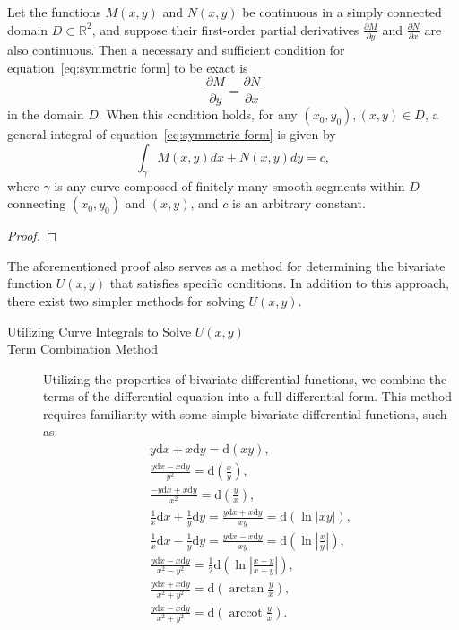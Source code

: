 \documentclass[11pt]{../../TexTemplate/elegantbook}
\begin{document}
\begin{theorem}
    Let the functions \(M(x, y)\) and \(N(x, y)\) be continuous in a simply connected domain \(D \subset \mathbb{R}^2\), 
    and suppose their first-order partial derivatives \(\frac{\partial M}{\partial y}\) and \(\frac{\partial N}{\partial x}\) are also continuous. 
    Then a necessary and sufficient condition for equation~\eqref{eq:symmetric form} to be exact is
    \[
    \frac{\partial M}{\partial y} = \frac{\partial N}{\partial x}
    \]
    in the domain \(D\). 
    When this condition holds, for any \((x_0, y_0), (x, y) \in D\), a general integral of equation~\eqref{eq:symmetric form} is given by
    \[
    \int_{\gamma} M(x, y)dx + N(x, y)dy = c,
    \]
    where \(\gamma\) is any curve composed of finitely many smooth segments within \(D\) 
    connecting \((x_0, y_0)\) and \((x, y)\), and \(c\) is an arbitrary constant.
\end{theorem}
\begin{proof}
    
\end{proof}

The aforementioned proof also serves as a method for determining the bivariate function $U(x, y)$ 
that satisfies specific conditions. In addition to this approach, 
there exist two simpler methods for solving $U(x, y)$.

\begin{description}
    \item [Utilizing Curve Integrals to Solve $U(x, y)$] 


    \item [Term Combination Method]
        Utilizing the properties of bivariate differential functions, 
        we combine the terms of the differential equation into a full differential form. 
        This method requires familiarity with some simple bivariate differential functions, such as:
        \begin{gather*}
            y\mathrm{d}x + x\mathrm{d}y = \mathrm{d}(xy), \\
            \frac{y\mathrm{d}x-x\mathrm{d}y}{y^{2}} = \mathrm{d}\left(\frac{x}{y}\right), \\
            \frac{-y\mathrm{d}x+x\mathrm{d}y}{x^{2}} = \mathrm{d}\left(\frac{y}{x}\right), \\
            \frac{1}{x}\mathrm{d}x + \frac{1}{y}\mathrm{d}y = \frac{y\mathrm{d}x+x\mathrm{d}y}{xy} = \mathrm{d}(\ln |xy|), \\
            \frac{1}{x}\mathrm{d}x - \frac{1}{y}\mathrm{d}y = \frac{y\mathrm{d}x-x\mathrm{d}y}{xy} = \mathrm{d}(\ln |\frac{x}{y}|), \\
            \frac{y\mathrm{d}x-x\mathrm{d}y}{x^{2}-y^{2}} = \frac{1}{2}\mathrm{d}\left(\ln \left|\frac{x-y}{x+y}\right|\right), \\
            \frac{y\mathrm{d}x+x\mathrm{d}y}{x^{2}+y^{2}} = \mathrm{d}\left(\arctan \frac{y}{x}\right), \\
            \frac{y\mathrm{d}x-x\mathrm{d}y}{x^{2}+y^{2}} = \mathrm{d}\left( \operatorname{arccot} \frac{y}{x} \right).
        \end{gather*}
\end{description}
\end{document}

